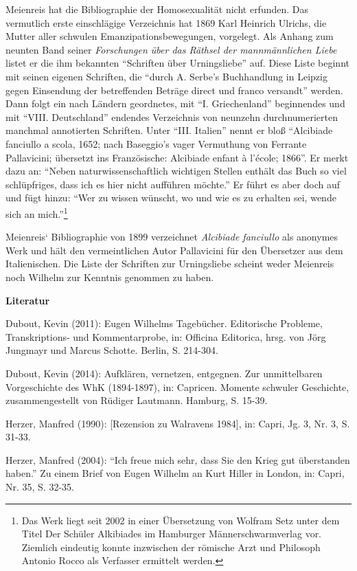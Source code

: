 \documentclass[a4paper,
fontsize=11pt,
oneside,
numbers=noperiodatend,
parskip=half-,
bibliography=totoc,
final
]{scrartcl}
\begin{document}
Meienreis hat die Bibliographie der Homosexualität nicht erfunden. Das
vermutlich erste einschlägige Verzeichnis hat 1869 Karl Heinrich
Ulrichs, die Mutter aller schwulen Emanzipationsbewegungen, vorgelegt.
Als Anhang zum neunten Band seiner \emph{Forschungen über das Räthsel
der mannmännlichen Liebe} listet er die ihm bekannten \enquote{Schriften
über Urningsliebe} auf. Diese Liste beginnt mit seinen eigenen
Schriften, die \enquote{durch A. Serbe's Buchhandlung in Leipzig gegen
Einsendung der betreffenden Beträge direct und franco versandt} werden.
Dann folgt ein nach Ländern geordnetes, mit \enquote{I. Griechenland}
beginnendes und mit \enquote{VIII. Deutschland} endendes Verzeichnis von
neunzehn durchnumerierten manchmal annotierten Schriften. Unter
\enquote{III. Italien} nennt er bloß \enquote{Alcibiade fanciullo a
scola, 1652; nach Baseggio's vager Vermuthung von Ferrante Pallavicini;
übersetzt ins Französische: Alcibiade enfant à l'école; 1866}. Er merkt
dazu an: \enquote{Neben naturwissenschaftlich wichtigen Stellen enthält
das Buch so viel schlüpfriges, dass ich es hier nicht aufführen möchte.}
Er führt es aber doch auf und fügt hinzu: \enquote{Wer zu wissen
wünscht, wo und wie es zu erhalten sei, wende sich an mich.}\footnote{Das
  Werk liegt seit 2002 in einer Übersetzung von Wolfram Setz unter dem
  Titel Der Schüler Alkibiades im Hamburger Männerschwarmverlag vor.
  Ziemlich eindeutig konnte inzwischen der römische Arzt und Philosoph
  Antonio Rocco als Verfasser ermittelt werden.}

Meienreis` Bibliographie von 1899 verzeichnet \emph{Alcibiade fanciullo}
als anonymes Werk und hält den vermeintlichen Autor Pallavicini für den
Übersetzer aus dem Italienischen. Die Liste der Schriften zur
Urningsliebe scheint weder Meienreis noch Wilhelm zur Kenntnis genommen
zu haben.

\textbf{Literatur}

Dubout, Kevin (2011): Eugen Wilhelms Tagebücher. Editorische Probleme,
Transkriptions- und Kommentarprobe, in: Officina Editorica, hrsg. von
Jörg Jungmayr und Marcus Schotte. Berlin, S. 214-304.

Dubout, Kevin (2014): Aufklären, vernetzen, entgegnen. Zur unmittelbaren
Vorgeschichte des WhK (1894-1897), in: Capricen. Momente schwuler
Geschichte, zusammengestellt von Rüdiger Lautmann. Hamburg, S. 15-39.

Herzer, Manfred (1990): {[}Rezension zu Walravens 1984{]}, in: Capri,
Jg. 3, Nr. 3, S. 31-33.

Herzer, Manfred (2004): \enquote{Ich freue mich sehr, dass Sie den Krieg
gut überstanden haben.} Zu einem Brief von Eugen Wilhelm an Kurt Hiller
in London, in: Capri, Nr. 35, S. 32-35.
\end{document}
